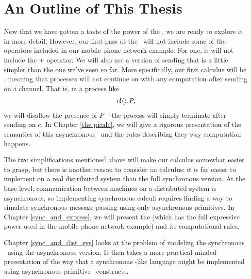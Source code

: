 \section{An Outline of This Thesis}	
	Now that we have gotten a taste of the power of the \picalc, we are ready to explore it in more detail.  
However, our first pass at the \picalc\ will not include some of the operators included in our mobile phone network example.  
For one, it will not include the $+$ operator.  
We will also use a version of sending that is a little simpler than the one we've seen so far.  
More specifically, our first calculus will be , meaning that processes will not continue on with any computation after sending on a channel.  
That is, in a process like
\[
	{c}!\langle{}\rangle.P,
\]
we will disallow the presence of $P$ -- the process will simply terminate after sending on $c$.  
In Chapter \ref{the picalc}, we will give a rigorous presentation of the semantics of this asynchronous \picalc\ and the rules describing they way computation happens.

The two simplifications mentioned above will make our calculus somewhat easier to grasp, but there is another reason to consider an  calculus: it is far easier to implement on a real distributed system than the full synchronous version.  
At the base level, communication between machines on a distributed system is asynchronous, so implementing synchronous calculi requires finding a way to simulate synchronous message passing using only asynchronous primitives.  
In Chapter \ref{sync_and_express}, we will present the  \picalc (which has the full expressive power used in the mobile phone network example) and its computational rules.

Chapter \ref{sync_and_dist_sys} looks at the problem of modeling the synchronous \picalc\ using the asynchronous version.  It then takes a more practical-minded presentation of the way that a synchronous \picalc-like language might be implemented using asynchronous primitive \picalc\ constructs.